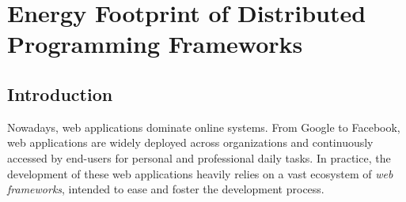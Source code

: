 \chapter{Energy Footprint of Distributed Programming Frameworks}
\label{chapter:porgramming_langauges}



\section*{Introduction}
Nowadays, web applications dominate online systems.
From Google to Facebook, web applications are widely deployed across organizations and continuously accessed by end-users for personal and professional daily tasks.
In practice, the development of these web applications heavily relies on a vast ecosystem of \emph{web frameworks}, intended to ease and foster the development process.

